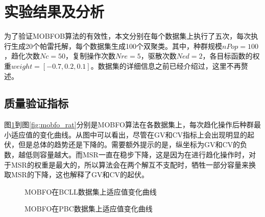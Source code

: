 \section{实验结果及分析}
为了验证MOBFOB算法的有效性，本文分别在每个数据集上执行了五次，每次执行生成20个帕雷托解，每个数据集生成100个双聚类。其中，种群规模$nPop=100$，趋化次数$Nc=50$，复制操作次数$Nre=5$，驱散次数$Ned=2$，各目标函数的权重$weight = [-0.7, 0.2, 0.1]$。数据集的详细信息之前已经介绍过，这里不再赘述。

    \subsection{质量验证指标}
    图\ref{fig:mobfo_bcll}到图\ref{fig:mobfo_rat}分别是MOBFO算法在各数据集上，每次趋化操作后种群最小适应值的变化曲线。从图中可以看出，尽管在GV和CV指标上会出现明显的起伏，但是总体的趋势还是下降的。需要额外提示的是，纵坐标为GV和CV的负数，越低则容量越大。而MSR一直在稳步下降，这是因为在进行趋化操作时，对于MSR的权重是最大的，所以算法会在两个解互不支配时，牺牲一部分容量来换取MSR的下降，这也解释了GV和CV的起伏。

    \begin{figure}[htbp]
    \setlength{\subfigcapskip}{-1bp}
    \centering
    \begin{minipage}{.9\textwidth}
    \centering
    \subfigure{}\addtocounter{subfigure}{-2}
    \hspace{.1em}
    \subfigure{}\addtocounter{subfigure}{-2}
    \hspace{.1em}
    \subfigure{}\addtocounter{subfigure}{-2}
    \end{minipage}
    \vspace{0.2em}
    \caption{MOBFO在BCLL数据集上适应值变化曲线}
    \label{fig:mobfo_bcll}
    \end{figure}

    \begin{figure}[htbp]
    \setlength{\subfigcapskip}{-1bp}
    \centering
    \begin{minipage}{.9\textwidth}
    \centering
    \subfigure{}\addtocounter{subfigure}{-2}
    \hspace{.2em}
    \subfigure{}\addtocounter{subfigure}{-2}
    \hspace{.2em}
    \subfigure{}\addtocounter{subfigure}{-2}
    \end{minipage}
    \vspace{0.2em}
    \caption{MOBFO在PBC数据集上适应值变化曲线}
    \label{fig:mobfo_pbc}
    \end{figure}

